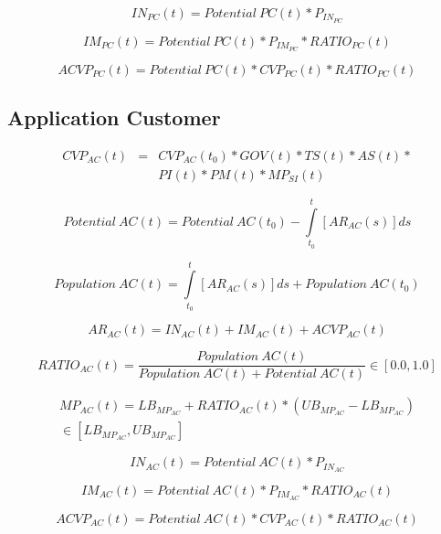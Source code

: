 \begin{equation}
		IN_{PC}(t) = \mathit{Potential~PC(t)} * P_{IN_{PC}}
\end{equation}

\begin{equation}
		IM_{PC}(t) = \mathit{Potential~PC(t)} * P_{IM_{PC}} * RATIO_{PC}(t)
\end{equation}

\begin{equation}
		ACVP_{PC}(t) = \mathit{Potential~PC(t)} * CVP_{PC}(t) * RATIO_{PC}(t)
\end{equation}

\subsection{Application Customer}\label{ch:app04:csf:ac}

\begin{eqnarray}
		CVP_{AC}(t) & = & CVP_{AC}(t_0) * GOV(t) * TS(t) * AS(t) * \nonumber \\ & & PI(t) * PM(t) * MP_{SI}(t)
\end{eqnarray}

\begin{equation}
	\mathit{Potential~AC(t)} =\mathit{Potential~AC(t_0)} - \int\limits_{t_0}^t  [AR_{AC}(s)]ds
\end{equation}

\begin{equation}
	\mathit{Population~AC(t)} = \int\limits_{t_0}^t [AR_{AC}(s)]ds + \mathit{Population~AC(t_0)}
\end{equation}

\begin{equation}
		AR_{AC}(t) = IN_{AC}(t) + IM_{AC}(t) + ACVP_{AC}(t)	
\end{equation}

\begin{equation}
		RATIO_{AC}(t) = \frac{\mathit{Population~AC(t)}}{\mathit{Population~AC(t)} + \mathit{Potential~AC(t)}} \in [0.0,1.0]
\end{equation}

\begin{eqnarray}
	MP_{AC}(t) = LB_{MP_{AC}} + RATIO_{AC}(t) * (UB_{MP_{AC}} - LB_{MP_{AC}})  \nonumber \\ \in [LB_{MP_{AC}},UB_{MP_{AC}}]
\end{eqnarray}

\begin{equation}
		IN_{AC}(t) = \mathit{Potential~AC(t)} * P_{IN_{AC}}
\end{equation}

\begin{equation}
		IM_{AC}(t) = \mathit{Potential~AC(t)} * P_{IM_{AC}} * RATIO_{AC}(t)
\end{equation}

\begin{equation}
		ACVP_{AC}(t) = \mathit{Potential~AC(t)} * CVP_{AC}(t) * RATIO_{AC}(t)
\end{equation}